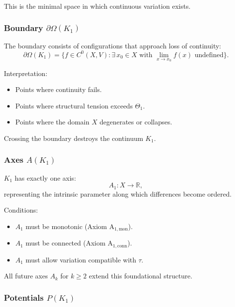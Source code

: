 This is the minimal space in which continuous variation exists.

\subsubsection{Boundary \texorpdfstring{$\partial\Omega(K_1)$}{\partial\Omega(K_1)}}

The boundary consists of configurations that approach loss of
continuity:
\[
\partial\Omega(K_1) =
\{ f \in C^0(X,V) : \exists\, x_0 \in X \text{ with } 
\lim_{x \to x_0} f(x) \text{ undefined} \}.
\]

Interpretation:
\begin{itemize}
    \item Points where continuity fails.
    \item Points where structural tension exceeds $\Theta_1$.
    \item Points where the domain $X$ degenerates or collapses.
\end{itemize}

Crossing the boundary destroys the continuum $K_1$.

\subsubsection{Axes \texorpdfstring{$A(K_1)$}{A(K_1)}}

$K_1$ has exactly one axis:
\[
A_1 : X \to \mathbb{R},
\]
representing the intrinsic parameter along which differences become
ordered.

Conditions:
\begin{itemize}
    \item $A_1$ must be monotonic (Axiom A$_{1,\text{mon}}$).
    \item $A_1$ must be connected (Axiom A$_{1,\text{conn}}$).
    \item $A_1$ must allow variation compatible with $\tau$.
\end{itemize}

All future axes $A_k$ for $k \ge 2$ extend this foundational structure.

\subsubsection{Potentials \texorpdfstring{$P(K_1)$}{P(K_1)}}

